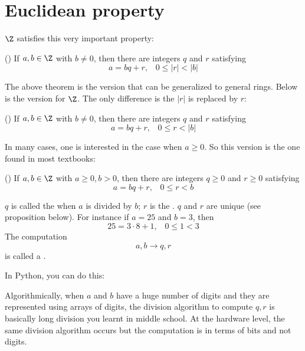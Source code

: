\section{Euclidean property}

$\Z$ satisfies this very important property:

\begin{thm}\label{euclideanproperty}
  \textnormal{()}
  If $a, b \in \Z$ with $b \neq 0$, then there are
  integers $q$ and $r$ 
  satisfying
  \[
  a = bq + r, \,\,\,\,\, 0 \leq |r| < |b|
  \]
\end{thm}

The above theorem is the version that can be generalized to general
rings.
Below is the version for $\Z$.
The only difference is the $|r|$ is replaced by $r$:
\begin{thm}\label{euclideanproperty2}
  \textnormal{()}
  If $a, b \in \Z$ with $b \neq 0$, then there are
  integers $q$ and $r$ 
  satisfying
  \[
  a = bq + r, \,\,\,\,\, 0 \leq r < |b|
  \]
\end{thm}

In many cases, one is interested in the case when $a \geq 0$.
So this version is the one found in most textbooks:

\begin{thm}\label{euclideanproperty3}
  \textnormal{()}
  If $a, b \in \Z$ with $a \geq 0, b > 0$, then there are
  integers $q \geq 0$ and $r \geq 0$ 
  satisfying
  \[
  a = bq + r, \,\,\,\,\, 0 \leq r < b
  \]
\end{thm}

$q$ is called the
when $a$ is divided by $b$; $r$ is the
.
$q$ and $r$ are unique (see proposition below).
For instance if $a = 25$ and $b = 3$, then
\[
25 = 3 \cdot 8 + 1, \,\,\,\,\, 0 \leq 1 < 3
\]
The computation
\[
a,b \rightarrow q, r
\]
is called a
.

In Python, you can do this:
Algorithmically, when $a$ and $b$ have a huge number of digits
and they are represented using arrays of digits, the division
algorithm to compute $q,r$ is basically long division you learnt in middle
school.
At the hardware level, the same division algorithm occurs but
the computation is in terms of bits and not digits.

